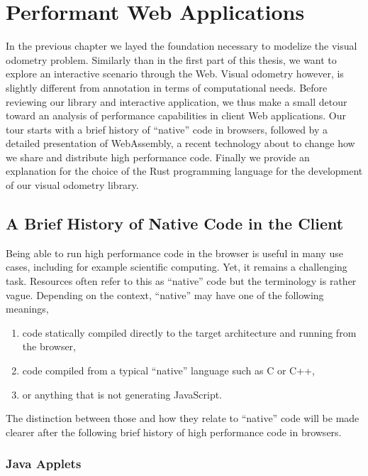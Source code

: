 \chapter{Performant Web Applications}%
\label{cha:performant_web_applications}

\minitoc%
\clearpage

In the previous chapter we layed the foundation necessary
to modelize the visual odometry problem.
Similarly than in the first part of this thesis,
we want to explore an interactive scenario through the Web.
Visual odometry however, is slightly different from annotation
in terms of computational needs.
Before reviewing our library and interactive application,
we thus make a small detour toward an analysis of
performance capabilities in client Web applications.
Our tour starts with a brief history of ``native'' code in browsers,
followed by a detailed presentation of WebAssembly,
a recent technology about to change how we share and distribute
high performance code.
Finally we provide an explanation for the choice of the Rust
programming language for the development of our visual odometry library.

\section{A Brief History of Native Code in the Client}%
\label{sec:native_client}

Being able to run high performance code in the browser
is useful in many use cases, including for example scientific computing.
Yet, it remains a challenging task.
Resources often refer to this as ``native'' code
but the terminology is rather vague.
Depending on the context, ``native'' may have one of the following meanings,
\begin{enumerate}
\setlength\itemsep{-0.5em}
	\item code statically compiled directly to the target architecture and running from the browser,
	\item code compiled from a typical ``native'' language such as C or C++,
	\item or anything that is not generating JavaScript.
\end{enumerate}
The distinction between those and how they relate to ``native'' code
will be made clearer after the following
brief history of high performance code in browsers.

\subsection{Java Applets}%
\label{sub:java_applets}

